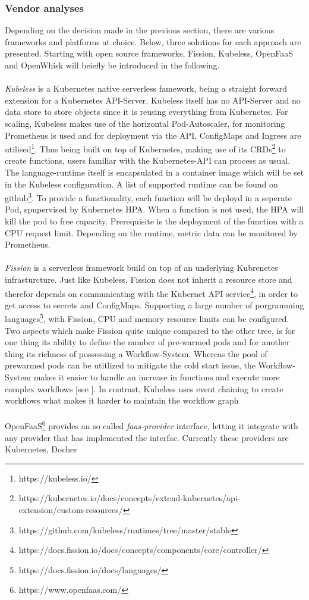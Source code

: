 \documentclass[11pt]{article}
\begin{document}
\subsubsection{Vendor analyses}
Depending on the decision made in the previous section, there are various frameworks and platforms at choice. Below, three solutions for each approach are presented. Starting with open source frameworks, Fission, Kubeless, OpenFaaS and OpenWhisk will beiefly be introduced in the following.\\\\ \textit{Kubeless} is a Kubernetes native serverless famework, being a straight forward extension for a Kubernetes API-Server. Kubeless itself has no API-Server and no data store to store objects since it is reusing everything from Kubernetes. For scaling, Kubeless makes use of the horizontal Pod-Autoscaler, for monitoring Prometheus is used and for deployment via the API, ConfigMaps and Ingress are utilised\footnote{https://kubeless.io/}. Thus being built on top of Kubernetes, making use of its CRDs\footnote{https://kubernetes.io/docs/concepts/extend-kubernetes/api-extension/custom-resources/} to create functions, users familiar with the Kubernetes-API can process as usual. The language-runtime itself is encapsulated in a container image which will be set in the Kubeless configuration. A list of supported runtime can be found on github\footnote{https://github.com/kubeless/runtimes/tree/master/stable}. To provide a functionality, each function will be deployd in a seperate Pod, spupervised by Kubernetes HPA. When a function is not used, the HPA will kill the pod to free capacity. Prerequisite is the deployment of the function with a CPU request limit. Depending on the runtime, metric data can be monitored by Prometheus.\\\\ \textit{Fission} is a serverless framework build on top of an underlying Kubrenetes infrasturcture. Just like Kubeless, Fission does not inherit a resource store and therefor depends on communicating with the Kubernet API service\footnote{https://docs.fission.io/docs/concepts/components/core/controller/}, in order to get access to secrets and \glqq ConfigMaps\grqq{}. Supporting a large number of porgramming languages\footnote{https://docs.fission.io/docs/languages/}, with Fission, CPU and memory resource limits can be configured. Two aspects which make Fission quite unique compared to the other tree, is for one thing its ability to define the number of pre-warmed pods and for another thing its richness of possessing a Workflow-System. Whereas the pool of prewarmed pods can be utitlized to mitigate the cold start issue, the Workflow-System makes it easier to handle an increase in functions and execute more complex workflows [see \cite{kritikos2018review}]. In contrast, Kubeless uses event chaining to create workflows what makes it harder to maintain the workflow graph \\\\ OpenFaaS\footnote{https://www.openfaas.com/} provides an so called \textit{faas-provider} interface, letting it integrate with any provider that has implemented the interfac. Currently these providers are Kubernetes, Docher 
\end{document}
